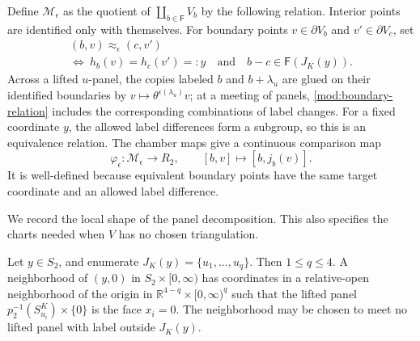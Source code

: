 Define \(\mathcal M_\epsilon\) as the quotient of
\(\coprod_{b\in\mathsf F}V_b\) by the following relation.  Interior
points are identified only with themselves.  For boundary points
\(v\in\partial V_b\) and \(v'\in\partial V_c\), set
\begin{equation}\label{mod:boundary-relation}
 \begin{gathered}
 (b,v)\approx_\epsilon(c,v')\\
 \Longleftrightarrow\
 h_b(v)=h_c(v')=:y
 \quad\text{and}\quad
 b-c\in\mathsf F(J_K(y)).
 \end{gathered}
\end{equation}
Across a lifted \(u\)-panel, the copies labeled \(b\) and
\(b+\lambda_u\) are glued on their identified boundaries by
\(v\mapsto\theta^{\epsilon(\lambda_u)}v\); at a meeting of panels,
\eqref{mod:boundary-relation} includes the corresponding combinations
of label changes.
For a fixed coordinate \(y\), the allowed label differences form a
subgroup, so this is an equivalence relation.  The chamber maps give
a continuous comparison map
\begin{equation}\label{mod:comparison-map}
 \varphi_\epsilon:\mathcal M_\epsilon\longrightarrow R_2,\qquad
 [b,v]\longmapsto[b,j_b(v)].
\end{equation}
It is well-defined because equivalent boundary points have the same
target coordinate and an allowed label difference.

We record the local shape of the panel decomposition.  This also
specifies the charts needed when \(V\) has no chosen triangulation.

\begin{lemma}\label{mod:panel-coordinates}
Let \(y\in S_2\), and enumerate
\(J_K(y)=\{u_1,\ldots,u_q\}\).  Then \(1\leq q\leq4\).  A neighborhood
of \((y,0)\) in \(S_2\times[0,\infty)\) has coordinates in a
relative-open neighborhood of the origin in
\(\mathbb R^{4-q}\times[0,\infty)^q\) such that the lifted panel
\(p_2^{-1}(S^K_{u_i})\times\{0\}\) is the face \(x_i=0\).
The neighborhood may be chosen to meet no lifted panel with label
outside \(J_K(y)\).
\end{lemma}


